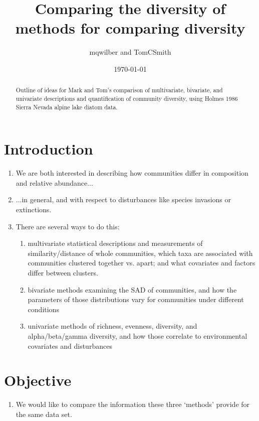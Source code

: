 \documentclass[a4paper]{article}
\title{Comparing the diversity of methods for comparing diversity}
\author{mqwilber and TomCSmith}
\date{\today}
\begin{document}
\maketitle

\begin{abstract}
Outline of ideas for Mark and Tom's comparison of multivariate, bivariate, and
univariate descriptions and quantification of community diversity, using Holmes
1986 Sierra Nevada alpine lake diatom data.
\end{abstract}

\section{Introduction}

\begin{enumerate}

    \item We are both interested in describing how communities differ in
        composition and relative abundance...

    \item ...in general, and with respect to disturbances like species
        invasions or extinctions.

    \item There are several ways to do this:

    \begin{enumerate}

     \item multivariate statistical descriptions and measurements of
         similarity/distance of whole communities, which taxa are associated
         with communities clustered together vs. apart; and what covariates and
         factors differ between clusters.

     \item bivariate methods examining the SAD of communities, and how the
         parameters of those distributions vary for communities under
         different conditions

     \item univariate methods of richness, evenness, diversity, and
         alpha/beta/gamma diversity, and how those correlate to environmental
         covariates and disturbances

    \end{enumerate}

\end{enumerate}

\section{Objective}
\begin{enumerate}

    \item We would like to compare the information these three `methods'
        provide for the same data set.

\end{enumerate}
\end{document}
